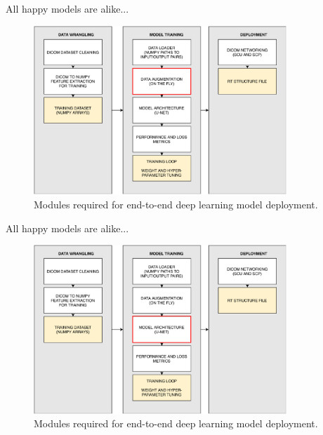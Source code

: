 \documentclass[9pt]{beamer}
\begin{document}
\begin{frame}{All happy models are alike...}
  \begin{figure}
    \includegraphics[width=0.85\textwidth]{images/modules_augmentation}
    \caption{Modules required for end-to-end deep learning model deployment.}
  \end{figure}
\end{frame}

\begin{frame}{All happy models are alike...}
  \begin{figure}
    \includegraphics[width=0.85\textwidth]{images/modules_model}
    \caption{Modules required for end-to-end deep learning model deployment.}
  \end{figure}
\end{frame}
\end{document}
